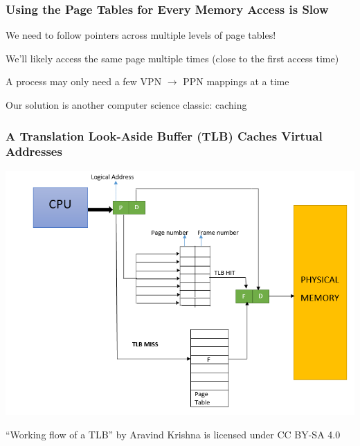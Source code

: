   \begin{frame}
    \frametitle{Using the Page Tables for Every Memory Access is Slow}

    We need to follow pointers across multiple levels of page tables!

    \vspace{2em}

    We'll likely access the same page multiple times (close to the first access time)

    \vspace{2em}

    A process may only need a few VPN $\rightarrow$ PPN mappings at a time

    \vspace{2em}

    Our solution is another computer science classic: caching
  \end{frame}

  \begin{frame}
    \frametitle{A Translation Look-Aside Buffer (TLB) Caches Virtual Addresses}

    \begin{center}
    \includegraphics[scale=0.45]{tlb.png}
    \end{center}

    ``Working flow of a TLB'' by Aravind Krishna is licensed under CC BY-SA 4.0
  \end{frame}

